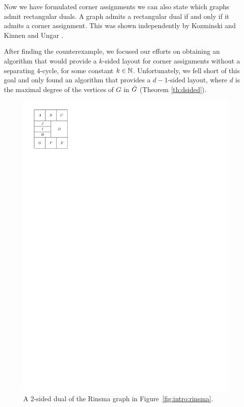   Now we have formulated corner assignments we can also state which graphs admit rectangular duals.
  A graph admits a rectangular dual if and only if it admits a corner assignment.
  This was shown independently by Kozminski and Kinnen \cite{Kozminski1984} and Ungar \cite{Ungar1953}.

  After finding the counterexample, we focused our efforts on obtaining an algorithm that would provide a $k$-sided layout for corner assignments without a separating $4$-cycle, for some constant $k \in \mathbb{N}$.
  Unfortunately, we fell short of this goal and only found an algorithm that provides a $d-1$-sided layout, where $d$ is the maximal degree of the vertices of $G$ in $\bar{G}$ (Theorem \ref{th:dsided}).

  \begin{figure} %
    \centering
    \includegraphics[]{introduction/img/rinsma2Sided.pdf}
    \caption{A 2-sided dual of the Rinsma graph in Figure~\ref{fig:intro:rinsma}.}
    \label{fig:intro:rinsma2Sided}
  \end{figure}

